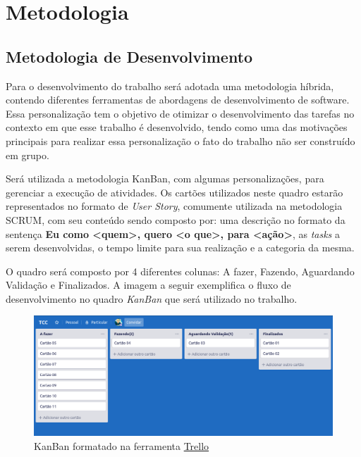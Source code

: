 \chapter[Metodologia]{Metodologia}

\section{Metodologia de Desenvolvimento}

Para o desenvolvimento do trabalho será adotada uma metodologia híbrida, contendo diferentes ferramentas de abordagens de desenvolvimento de software. Essa personalização tem o objetivo de otimizar o desenvolvimento das tarefas no contexto em que esse trabalho é desenvolvido, tendo como uma das motivações principais para realizar essa personalização o fato do trabalho não ser construído em grupo.

Será utilizada a metodologia KanBan, com algumas personalizações, para gerenciar a execução de atividades. Os cartões utilizados neste quadro estarão representados no formato de \textit{User Story}, comumente utilizada na metodologia SCRUM, com seu conteúdo sendo composto por: uma descrição no formato da sentença \textbf{Eu como <quem>, quero <o que>, para <ação>}, as \textit{tasks} a serem desenvolvidas, o tempo limite para sua realização e a categoria da mesma.

O quadro será composto por 4 diferentes colunas: A fazer, Fazendo, Aguardando Validação e Finalizados. A imagem a seguir exemplifica o fluxo de desenvolvimento no quadro \textit{KanBan} que será utilizado no trabalho.

    \begin{figure}[H]
         \centering
         \includegraphics[scale=0.4]{figuras/capitulo_4/kanban_exemplo.png}
         \caption{KanBan formatado na ferramenta \href{https://trello.com/}{Trello}}
         \label{fig:kanban_trello_exe}
    \end{figure}

